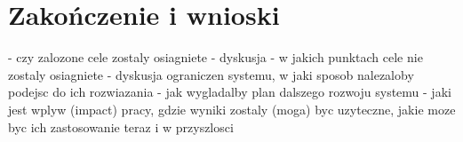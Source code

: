 \chapter{Zakończenie i wnioski}

\begin{comment}

\end{comment}
- czy zalozone cele zostaly osiagniete - dyskusja
- w jakich punktach cele nie zostaly osiagniete
- dyskusja ograniczen systemu, w jaki sposob nalezaloby podejsc do ich
rozwiazania
- jak wygladalby plan dalszego rozwoju systemu
- jaki jest wplyw (impact) pracy, gdzie wyniki zostaly (moga) byc uzyteczne,
jakie moze byc ich zastosowanie teraz i w przyszlosci
